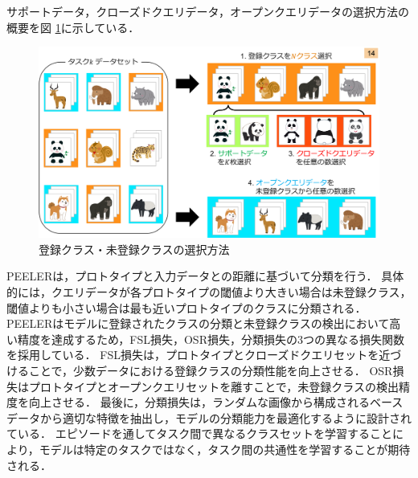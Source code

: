 \documentclass[a4paper,11pt,nomag]{jsreport}
\begin{document}
サポートデータ，クローズドクエリデータ，オープンクエリデータの選択方法の概要を図 \ref{fig:peeler_data}に示している．
% 
\begin{figure}[tbp]
  \centering
  \includegraphics[width=\linewidth, keepaspectratio]{image/meta-class.png}
  \caption{登録クラス・未登録クラスの選択方法}
  \label{fig:peeler_data}
\end{figure}
%
PEELERは，プロトタイプと入力データとの距離に基づいて分類を行う．
具体的には，クエリデータが各プロトタイプの閾値より大きい場合は未登録クラス，閾値よりも小さい場合は最も近いプロトタイプのクラスに分類される．
PEELERはモデルに登録されたクラスの分類と未登録クラスの検出において高い精度を達成するため，FSL損失，OSR損失，分類損失の3つの異なる損失関数を採用している．
FSL損失は，プロトタイプとクローズドクエリセットを近づけることで，少数データにおける登録クラスの分類性能を向上させる．
OSR損失はプロトタイプとオープンクエリセットを離すことで，未登録クラスの検出精度を向上させる．
最後に，分類損失は，ランダムな画像から構成されるベースデータから適切な特徴を抽出し，モデルの分類能力を最適化するように設計されている．
エピソードを通してタスク間で異なるクラスセットを学習することにより，モデルは特定のタスクではなく，タスク間の共通性を学習することが期待される．
\end{document}
